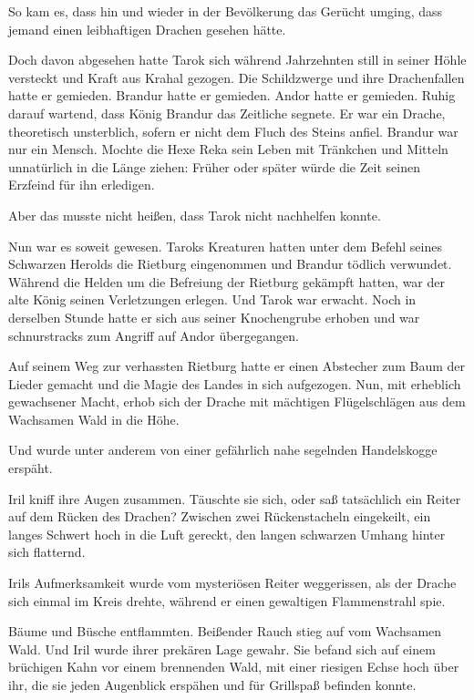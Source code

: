 So kam es, dass hin und wieder in der Bevölkerung das Gerücht umging, dass jemand einen leibhaftigen Drachen gesehen hätte.

Doch davon abgesehen hatte Tarok sich während Jahrzehnten still in seiner Höhle versteckt und Kraft aus Krahal gezogen. Die Schildzwerge und ihre Drachenfallen hatte er gemieden. Brandur hatte er gemieden. Andor hatte er gemieden. Ruhig darauf wartend, dass König Brandur das Zeitliche segnete. Er war ein Drache, theoretisch unsterblich, sofern er nicht dem Fluch des Steins anfiel. Brandur war nur ein Mensch. Mochte die Hexe Reka sein Leben mit Tränkchen und Mitteln unnatürlich in die Länge ziehen: Früher oder später würde die Zeit seinen Erzfeind für ihn erledigen.

Aber das musste nicht heißen, dass Tarok nicht nachhelfen konnte.

Nun war es soweit gewesen. Taroks Kreaturen hatten unter dem Befehl seines Schwarzen Herolds die Rietburg eingenommen und Brandur tödlich verwundet. Während die Helden um die Befreiung der Rietburg gekämpft hatten, war der alte König seinen Verletzungen erlegen. Und Tarok war erwacht. Noch in derselben Stunde hatte er sich aus seiner Knochengrube erhoben und war schnurstracks zum Angriff auf Andor übergegangen.

Auf seinem Weg zur verhassten Rietburg hatte er einen Abstecher zum Baum der Lieder gemacht und die Magie des Landes in sich aufgezogen. Nun, mit erheblich gewachsener Macht, erhob sich der Drache mit mächtigen Flügelschlägen aus dem Wachsamen Wald in die Höhe.

Und wurde unter anderem von einer gefährlich nahe segelnden Handelskogge erspäht.

Iril kniff ihre Augen zusammen. Täuschte sie sich, oder saß tatsächlich ein Reiter auf dem Rücken des Drachen? Zwischen zwei Rückenstacheln eingekeilt, ein langes Schwert hoch in die Luft gereckt, den langen schwarzen Umhang hinter sich flatternd.

Irils Aufmerksamkeit wurde vom mysteriösen Reiter weggerissen, als der Drache sich einmal im Kreis drehte, während er einen gewaltigen Flammenstrahl spie.

Bäume und Büsche entflammten. Beißender Rauch stieg auf vom Wachsamen Wald. Und Iril wurde ihrer prekären Lage gewahr. Sie befand sich auf einem brüchigen Kahn vor einem brennenden Wald, mit einer riesigen Echse hoch über ihr, die sie jeden Augenblick erspähen und für Grillspaß befinden konnte.

